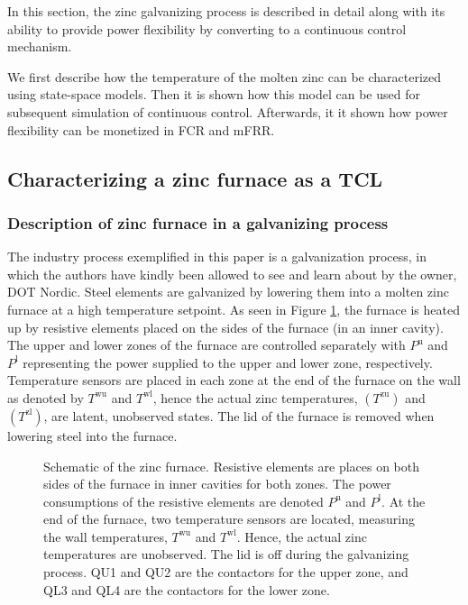 \documentclass[lettersize,journal]{IEEEtran}
\begin{document}
In this section, the zinc galvanizing process is described in detail along with its ability to provide power flexibility by converting to a continuous control mechanism.

We first describe how the temperature of the molten zinc can be characterized using state-space models. Then it is shown how this model can be used for subsequent simulation of continuous control. Afterwards, it it shown how power flexibility can be monetized in FCR and mFRR.

\subsection{Characterizing a zinc furnace as a TCL}



\subsubsection{Description of zinc furnace in a galvanizing process}

The industry process exemplified in this paper is a galvanization process, in which the authors have kindly been allowed to see and learn about by the owner, DOT Nordic. Steel elements are galvanized by lowering them into a molten zinc furnace at a high temperature setpoint. As seen in Figure \ref{fig:furnace_schematic_tikz}, the furnace is heated up by resistive elements placed on the sides of the furnace (in an inner cavity). The upper and lower zones of the furnace are controlled separately with $P^{\text{u}}$ and $P^{\text{l}}$ representing the power supplied to the upper and lower zone, respectively. Temperature sensors are placed in each zone at the end of the furnace on the wall as denoted by $T^{\text{wu}}$ and $T^{\text{wl}}$, hence the actual zinc temperatures, $(T^{\text{zu}})$ and $(T^{\text{zl}})$, are latent, unobserved states. The lid of the furnace is removed when lowering steel into the furnace.

\begin{figure}[t]
    \centering
    
    \caption{Schematic of the zinc furnace. Resistive elements are places on both sides of the furnace in inner cavities for both zones. The power consumptions of the resistive elements are denoted $P^{\text{u}}$ and $P^{\text{l}}$. At the end of the furnace, two temperature sensors are located, measuring the wall temperatures, $T^{\text{wu}}$ and $T^{\text{wl}}$. Hence, the actual zinc temperatures are unobserved. The lid is off during the galvanizing process. QU1 and QU2 are the contactors for the upper zone, and QL3 and QL4 are the contactors for the lower zone.}
    \label{fig:furnace_schematic_tikz}
\end{figure}
\end{document}
